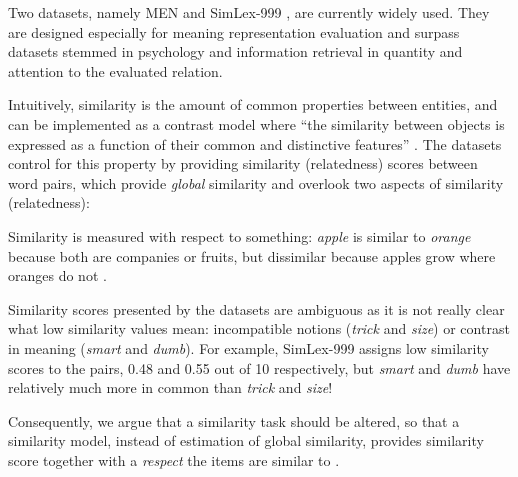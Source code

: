 \documentclass[11pt]{article}
\begin{document}
Two datasets, namely MEN \cite{Bruni:2012:DST:2390524.2390544} and SimLex-999 \cite{hill2014simlex}, are currently widely used. They are designed especially for meaning representation evaluation and surpass datasets stemmed in psychology \cite{1986-13502-00119860101} and information retrieval \cite{2002:PSC:503104.503110} in quantity and attention to the evaluated relation.

Intuitively, similarity is the amount of common properties between entities, and can be implemented as a contrast model where ``the similarity between objects is expressed as a function of their common and distinctive features'' \cite{Tversky1977}. The datasets control for this property by providing similarity (relatedness) scores between word pairs, which provide \emph{global} similarity and overlook two aspects of similarity (relatedness):
\begin{compactitem}
    \item Similarity is measured with respect to something: \textit{apple} is similar to \textit{orange} because both are companies or fruits, but dissimilar because apples grow where oranges do not \cite{hahn1997concepts}.
    \item Similarity scores presented by the datasets are ambiguous as it is not really clear what low similarity values mean: incompatible notions (\textit{trick} and \textit{size}) or contrast in meaning (\textit{smart} and \textit{dumb}). For example, SimLex-999 assigns low similarity scores to the pairs, 0.48 and 0.55 out of 10 respectively, but \textit{smart} and \textit{dumb} have relatively much more in common than \textit{trick} and \textit{size}!

\end{compactitem}
%
Consequently, we argue that a similarity task should be altered, so that a similarity model, instead of estimation of global similarity, provides similarity score together with a \emph{respect} the items are similar to \cite{hahn1997concepts}.

\end{document}
